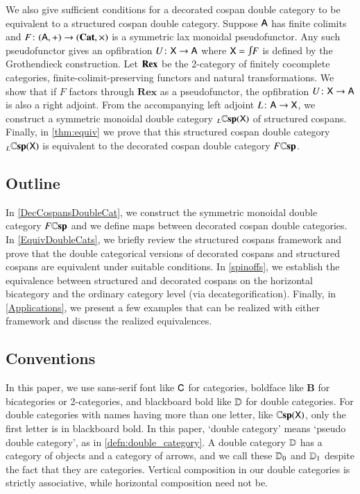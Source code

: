 \documentclass[reqno]{amsart}
\begin{document}
We also give sufficient conditions for a decorated cospan double category to be equivalent to a structured cospan double category. 
Suppose $\mathsf{A}$ has finite colimits and $F \colon (\mathsf{A} , +) \to (\mathbf{Cat}, \times)$ is a 
symmetric lax monoidal pseudofunctor.   Any such pseudofunctor gives an opfibration 
$U \colon \mathsf{X} \to \mathsf{A}$ where $\X = \inta F$ is defined by the Grothendieck construction.
Let $\mathbf{Rex}$ be the 2-category of finitely cocomplete categories, finite-colimit-preserving
functors and natural transformations.  We show that if $F$ factors through $\mathbf{Rex}$ as
a pseudofunctor, the opfibration $U \colon \mathsf{X} \to \mathsf{A}$ is also a right adjoint.  From the accompanying left adjoint $L \colon \mathsf{A} \to \mathsf{X}$, we  construct a symmetric monoidal double category ${}_L \mathbf{\mathbb Csp}(\mathsf{X})$ of structured cospans.  Finally, in \cref{thm:equiv} we prove that this structured cospan double category ${}_L \mathbf{\mathbb Csp}(\mathsf{X})$ is equivalent to the decorated cospan double category $F \mathbf{\mathbb Csp}$. 

\subsection*{Outline}

In \cref{DecCospansDoubleCat}, we construct the symmetric monoidal double category $F\mathbf{\mathbb Csp}$ and we define maps between decorated cospan double categories. In \cref{EquivDoubleCats}, we briefly review the structured cospans framework and prove that the double categorical versions of decorated cospans and structured cospans are equivalent under suitable conditions. In \cref{spinoffs}, we establish the equivalence between structured and decorated cospans on the horizontal bicategory and the ordinary category level (via decategorification).
Finally, in \cref{Applications}, we present a few examples that can be realized with either framework and discuss the realized equivalences.

\subsection*{Conventions}

In this paper, we use sans-serif font like $\mathsf{C}$ for categories, boldface like $\mathbf{B}$ for bicategories or 2-categories, and blackboard bold like $\mathbf{\mathbb D}$ for double categories. For double categories with names having more than one letter, like $\mathbf{\mathbb Csp}(\mathsf{X})$, only the first letter is in blackboard bold. In this paper, `double category' means `pseudo double category', as in \cref{defn:double_category}. A double category $\mathbf{\mathbb D}$ has a category of objects and a category of arrows, and we call these $\mathbf{\mathbb D}_0$ and $\mathbf{\mathbb D}_1$ despite the fact that they are categories. Vertical composition in our double categories is strictly associative, while horizontal composition need not be. 
\end{document}
